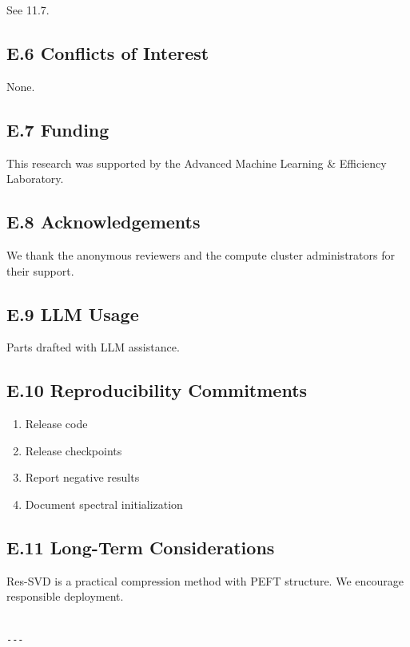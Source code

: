 See  11.7.

\subsection{E.6 Conflicts of Interest}

None.

\subsection{E.7 Funding}

This research was supported by the Advanced Machine Learning \& Efficiency Laboratory.

\subsection{E.8 Acknowledgements}

We thank the anonymous reviewers and the compute cluster administrators for their support.

\subsection{E.9 LLM Usage}

Parts drafted with LLM assistance.

\subsection{E.10 Reproducibility Commitments}

\begin{enumerate}
\item Release code
\item Release checkpoints
\item Report negative results
\item Document spectral initialization

\end{enumerate}
\subsection{E.11 Long-Term Considerations}

Res-SVD is a practical compression method with PEFT structure. We 
encourage responsible deployment.
\begin{lstlisting}

---
\end{lstlisting}